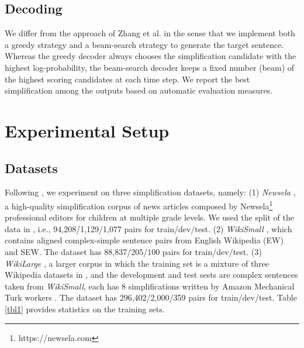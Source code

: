 \documentclass[11pt,a4paper]{article}
\begin{document}
\subsection{Decoding}
We differ from the approach of Zhang et al.  in the sense that we implement both a greedy strategy and a beam-search strategy to generate the target sentence. Whereas the greedy decoder always chooses the simplification candidate with the highest log-probability, the beam-search decoder keeps a fixed number (beam) of the highest scoring candidates at each time step. We report the best simplification among the outputs based on automatic evaluation measures.


\section{Experimental Setup}
\subsection{Datasets}
Following \cite{Zhang:17}, we experiment on three simplification datasets, namely: (1) \textit{Newsela}  \cite{Xu:15}, a high-quality simplification corpus of news articles composed by Newsela\footnote{https://newsela.com} professional editors for children at multiple grade levels. We used the split of the data in \cite{Zhang:17}, i.e., 94,208/1,129/1,077 pairs for train/dev/test. (2) \textit{WikiSmall} \cite{Zhu:10},  which contains aligned complex-simple sentence pairs from English Wikipedia (EW) and SEW. The dataset has 88,837/205/100 pairs for train/dev/test. (3) \textit{WikiLarge} \cite{Zhang:17}, a larger corpus in which the training set is a mixture of three Wikipedia datasets in \cite{Zhu:10,Woodsend:11,Kauchak:13}, and the development and test sests are complex sentences taken from \textit{WikiSmall}, each has 8 simplifications written by Amazon Mechanical Turk workers \cite{Xu:16}. The dataset has 296,402/2,000/359 pairs for train/dev/test. Table \ref{tbl1} provides statistics on the training sets.
\end{document}
